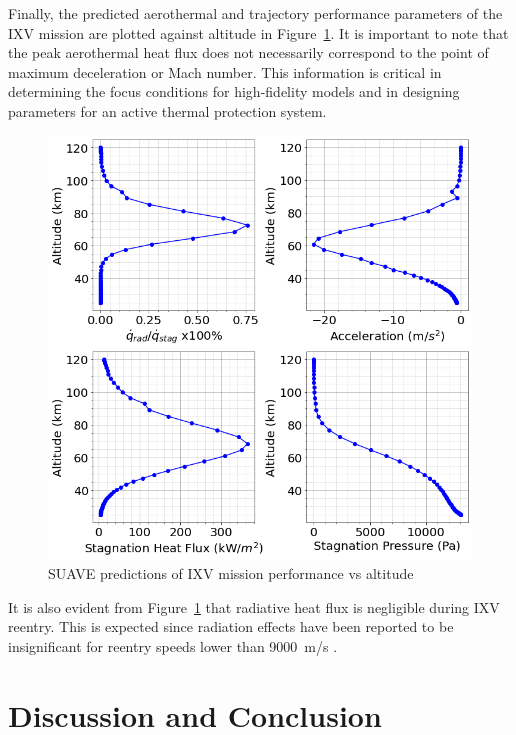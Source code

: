 \documentclass[%
 aip,
 amsmath,amssymb,
preprint,%
]{revtex4-1}
\begin{document}
Finally, the predicted aerothermal and trajectory performance parameters of the IXV mission are plotted against altitude in Figure~\ref{res1}. It is important to note that the peak aerothermal heat flux does not necessarily correspond to the point of maximum deceleration or Mach number. This information is critical in determining the focus conditions for high-fidelity models and in designing parameters for an active thermal protection system. 

\begin{figure}[ht]
\centering
\includegraphics[width=0.6\linewidth]{IXV_performance_vs_altitude_1976.png}
\caption{SUAVE predictions of IXV mission performance vs altitude}
\label{res1}
\end{figure}

It is also evident from Figure~\ref{res1} that radiative heat flux is negligible during IXV reentry. This is expected since radiation effects have been reported to be insignificant for reentry speeds lower than 9000~m/s \citep{brandis_benchmark_2017,winter_radiation_2019}. %

\section{Discussion and Conclusion}

\end{document}
